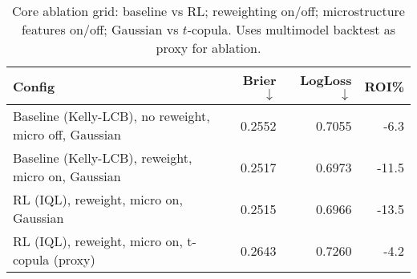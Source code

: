 \begin{table}[t]
  \centering
  \small
  \caption[Core ablation grid (mock)]{Core ablation grid: baseline vs RL; reweighting on/off; microstructure features on/off; Gaussian vs $t$-copula. Uses multimodel backtest as proxy for ablation.}
  \label{tab:core-ablation}
  \setlength{\tabcolsep}{3pt}\renewcommand{\arraystretch}{1.12}
  \begin{tabular}{@{} l r r r @{} }
    \toprule
    \textbf{Config} & \textbf{Brier $\downarrow$} & \textbf{LogLoss $\downarrow$} & \textbf{ROI\%} \\
    \midrule
    Baseline (Kelly-LCB), no reweight, micro off, Gaussian & 0.2552 & 0.7055 & -6.3 \\
    Baseline (Kelly-LCB), reweight, micro on, Gaussian & 0.2517 & 0.6973 & -11.5 \\
    RL (IQL), reweight, micro on, Gaussian & 0.2515 & 0.6966 & -13.5 \\
    RL (IQL), reweight, micro on, t-copula (proxy) & 0.2643 & 0.7260 & -4.2 \\
    \bottomrule
  \end{tabular}
\end{table}
